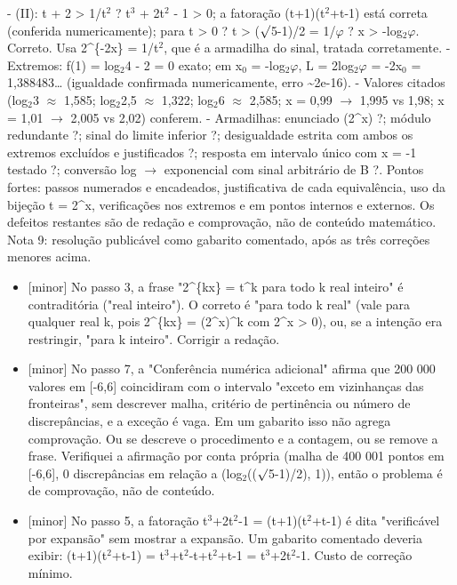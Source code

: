 \documentclass{article}%
\begin{document}
{-} (II): t + 2 > 1/t$^2$ ? t$^3$ + 2t$^2$ - 1 > 0; a fatoração (t+1)(t$^2$+t-1) está correta (conferida numericamente); para t > 0 ? t > ($\surd$5-1)/2 = 1/$\varphi$ ? x > -log$_{2}$$\varphi$. Correto. Usa 2\^{}\{-2x\} = 1/t$^2$, que é a armadilha do sinal, tratada corretamente.\newline%
{-} Extremos: f(1) = log$_{2}$4 - 2 = 0 exato; em x$_{0}$ = -log$_{2}$$\varphi$, L = 2log$_{2}$$\varphi$ = -2x$_{0}$ = 1,388483\ldots{} (igualdade confirmada numericamente, erro \textasciitilde{}2e{-}16).\newline%
{-} Valores citados (log$_{2}$3 $\approx$ 1,585; log$_{2}$2,5 $\approx$ 1,322; log$_{2}$6 $\approx$ 2,585; x = 0,99 $\to$ 1,995 vs 1,98; x = 1,01 $\to$ 2,005 vs 2,02) conferem.\newline%
{-} Armadilhas: enunciado (2\^{}x) ?; módulo redundante ?; sinal do limite inferior ?; desigualdade estrita com ambos os extremos excluídos e justificados ?; resposta em intervalo único com x = -1 testado ?; conversão log $\to$ exponencial com sinal arbitrário de B ?.\newline%
\newline%
Pontos fortes: passos numerados e encadeados, justificativa de cada equivalência, uso da bijeção t = 2\^{}x, verificações nos extremos e em pontos internos e externos. Os defeitos restantes são de redação e comprovação, não de conteúdo matemático. Nota 9: resolução publicável como gabarito comentado, após as três correções menores acima.%
\begin{itemize}%
\item%
{[}minor{]} No passo 3, a frase "2\^{}\{kx\} = t\^{}k para todo k real inteiro" é contraditória ("real inteiro"). O correto é "para todo k real" (vale para qualquer real k, pois 2\^{}\{kx\} = (2\^{}x)\^{}k com 2\^{}x > 0), ou, se a intenção era restringir, "para k inteiro". Corrigir a redação.%
\item%
{[}minor{]} No passo 7, a "Conferência numérica adicional" afirma que 200 000 valores em {[}{-}6,6{]} coincidiram com o intervalo "exceto em vizinhanças das fronteiras", sem descrever malha, critério de pertinência ou número de discrepâncias, e a exceção é vaga. Em um gabarito isso não agrega comprovação. Ou se descreve o procedimento e a contagem, ou se remove a frase. Verifiquei a afirmação por conta própria (malha de 400 001 pontos em {[}{-}6,6{]}, 0 discrepâncias em relação a (log$_{2}$(($\surd$5{-}1)/2), 1)), então o problema é de comprovação, não de conteúdo.%
\item%
{[}minor{]} No passo 5, a fatoração t$^3$+2t$^2${-}1 = (t+1)(t$^2$+t{-}1) é dita "verificável por expansão" sem mostrar a expansão. Um gabarito comentado deveria exibir: (t+1)(t$^2$+t{-}1) = t$^3$+t$^2${-}t+t$^2$+t{-}1 = t$^3$+2t$^2${-}1. Custo de correção mínimo.%
\end{itemize}%
\end{document}
